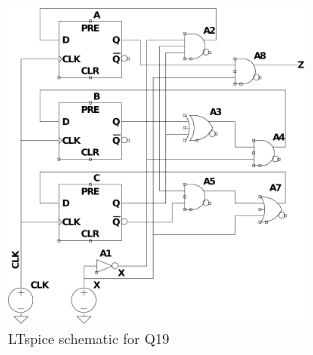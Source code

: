 \begin{figure}[!ht]
	\centering
	\includegraphics[width=0.7\textwidth]{inc/Q/Q19/Q19.pdf}
    \caption{LTspice schematic for Q19}\label{fig:Q19}
\end{figure}\FloatBarrier
